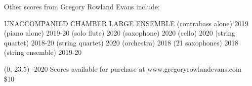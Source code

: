 \documentclass[11pt]{article}
\begin{document}

\begin{center}
\fontsize{.6cm}{1em}\selectfont Other scores from Gregory Rowland Evans include: \hfill
\end{center}
\vspace*{4\baselineskip}
{
\begin{center}
\setlength{\columnseprule}{1pt}
\setlength{\columnsep}{6em}

\begin{paracol}{3}
\fontsize{.3cm}{1em}\selectfont UNACCOMPANIED
\switchcolumn[1]
\fontsize{.3cm}{1em}\selectfont CHAMBER
\switchcolumn[2]
\fontsize{.3cm}{1em}\selectfont LARGE ENSEMBLE
\switchcolumn[0]
\fontsize{.1cm}{0.5em}  (contrabass alone) 2019
\switchcolumn[0]
\fontsize{.1cm}{0.5em}  (piano alone) 2019-20
\switchcolumn[0]
\fontsize{.1cm}{0.5em}  (solo flute) 2020
\switchcolumn[0]
\fontsize{.1cm}{0.5em}  (saxophone) 2020
\switchcolumn[0]
\fontsize{.1cm}{0.5em}  (cello) 2020
\switchcolumn[1]
\fontsize{.1cm}{0.5em}  (string quartet) 2018-20
\switchcolumn[1]
\fontsize{.1cm}{0.5em}  (string quartet) 2020
\switchcolumn[2]
\fontsize{.1cm}{0.5em}  (orchestra) 2018
\switchcolumn[2]
\fontsize{.1cm}{0.5em}  (21 saxophones) 2018
\switchcolumn[2]
\fontsize{.1cm}{0.5em}  (string ensemble) 2019-20


\end{paracol}
\end{center}
}

\begin{textblock}{23}(0, 23.5)
-2020 \hfill
Scores available for purchase at www.gregoryrowlandevans.com \hfill
\$10
\end{textblock}
\end{document}
